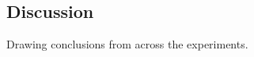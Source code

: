 
\subsection{Discussion}
Drawing conclusions from across the experiments. 
 
\begin{thebibliography}{99}
\end{thebibliography}

